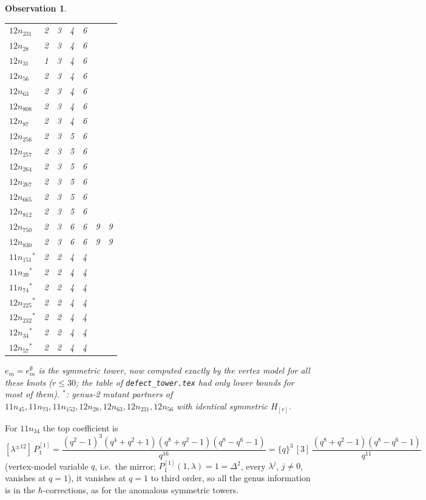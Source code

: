 \documentclass[11pt]{article}
\newtheorem{observation}{Observation}
\theoremstyle{remark}
\begin{document}
\begin{observation}
\begin{center}
\begin{tabular}{lcc|cc|cc}
$12n_{231}$ & 2 & 3 & 4 & 6 &  & \\
$12n_{28}$ & 2 & 3 & 4 & 6 &  & \\
$12n_{31}$ & 1 & 3 & 4 & 6 &  & \\
$12n_{56}$ & 2 & 3 & 4 & 6 &  & \\
$12n_{63}$ & 2 & 3 & 4 & 6 &  & \\
$12n_{808}$ & 2 & 3 & 4 & 6 &  & \\
$12n_{87}$ & 2 & 3 & 4 & 6 &  & \\
$12n_{256}$ & 2 & 3 & 5 & 6 &  & \\
$12n_{257}$ & 2 & 3 & 5 & 6 &  & \\
$12n_{264}$ & 2 & 3 & 5 & 6 &  & \\
$12n_{267}$ & 2 & 3 & 5 & 6 &  & \\
$12n_{665}$ & 2 & 3 & 5 & 6 &  & \\
$12n_{812}$ & 2 & 3 & 5 & 6 &  & \\
$12n_{750}$ & 2 & 3 & 6 & 6 & 9 & 9\\
$12n_{830}$ & 2 & 3 & 6 & 6 & 9 & 9\\
$11n_{151}$$^*$ & 2 & 2 & 4 & 4 &  & \\
$11n_{39}$$^*$ & 2 & 2 & 4 & 4 &  & \\
$11n_{74}$$^*$ & 2 & 2 & 4 & 4 &  & \\
$12n_{225}$$^*$ & 2 & 2 & 4 & 4 &  & \\
$12n_{232}$$^*$ & 2 & 2 & 4 & 4 &  & \\
$12n_{34}$$^*$ & 2 & 2 & 4 & 4 &  & \\
$12n_{57}$$^*$ & 2 & 2 & 4 & 4 &  & \\
\bottomrule
\end{tabular}
\end{center}
$e_m=e^\emptyset_m$ is the symmetric tower, now computed exactly by the vertex model for all these knots
($r\le30$; the table of \texttt{defect\_tower.tex} had only lower bounds for most of them).  $^*$: genus-2 mutant partners
of $11n_{45},11n_{73},11n_{152},12n_{28},12n_{63},12n_{231},12n_{56}$ with identical symmetric $H_{[r]}$.
\end{observation}


For $11n_{34}$ the top coefficient is
\[
  [\lambda^{\pm12}]\,P^{[1]}_1=\frac{(q^2-1)^3(q^4+q^2+1)(q^8+q^2-1)(q^8-q^6-1)}{q^{16}}
  =\{q\}^3\,[3]\,\frac{(q^8+q^2-1)(q^8-q^6-1)}{q^{11}}
\]
(vertex-model variable $q$, i.e.\ the mirror; $P^{[1]}_1(1,\lambda)=1=\Delta^2$, every $\lambda^{j}$, $j\neq0$, vanishes at $q=1$),
it vanishes at $q=1$ to third order, so all the genus information is in the $\hbar$-corrections, as for the
anomalous symmetric towers.
\end{document}
